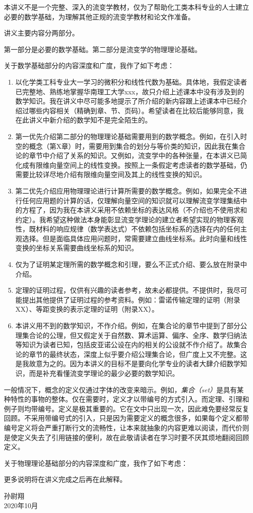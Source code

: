 \documentclass[main.tex]{subfiles}
\begin{document}
本讲义不是一个完整、深入的流变学教材，仅为了帮助化工类本科专业的人士建立必要的数学基础，为理解其他正规的流变学教材和论文作准备。

讲义主要内容分两部分。

第一部分是必要的数学基础。第二部分是流变学的物理理论基础。

关于数学基础部分的内容深度和广度，我作了如下考虑：
\begin{enumerate}
    \item 以化学类工科专业大一学习的微积分和线性代数为基础。具体地，我假定读者已完整地、熟练地掌握华南理工大学xxx，故只介绍上述课本中没有涉及到的数学知识。我在讲义中尽可能多地提示了所介绍的新内容跟上述课本中已经介绍过哪些内容相关（精确到章、节、页码）。希望读者在比较后能够同意，我在此讲义中新介绍的数学知不是完全陌生的。
    \item 第一优先介绍第二部分的物理理论基础需要用到的数学概念。例如，在引入时空的概念（第X章）时，需要用到集合的划分与等价类的知识，因此我在集合论的章节中介绍了关系的知识。又例如，流变学中的各种张量，在本讲义已简化成有限维向量空间上的线性变换。按照上一条假定考虑读者的数学基础，仍需要比较详尽地介绍有限维向量空间及其上的线性变换的知识。
    \item 第二优先介绍应用物理理论进行计算所需要的数学概念。例如，如果完全不进行任何应用题的计算的话，仅理解向量空间的知识就可以理解流变学理集结中的方程了，因为我在本讲义采用不依赖坐标的表达风格（不介绍也不使用求和约定）。我希望这种做法本身能彰显流变学理论的建立者希望实现的物理客观性，既材料的响应规律（数学表达式）不依赖包括坐标系的选择在内的任何主观选择。但是面临具体应用问题时，常需要建立曲线坐标系。此时向量和线性变换的坐标关系需要曲线坐标系的知识。
    \item 仅为了证明某定理所需的数学概念和引理，要么不正式介绍、要么放在附录中介绍。
    \item 定理的证明过程，仅供有兴趣的读者参考，故未必都提供。不提供时，我尽可能提出其他提供了证明过程的参考资料。例如：雷诺传输定理的证明（附录XX）、等距变换的表示定理的证明（附录XX）。
    \item 本讲义用不到的数学知识，不作介绍。例如，在集合论的章节中提到了部分公理集合论的公理，但又假定关于自然数、算术运算、偏序、全序、数学归纳法等知识为读者已知，包括皮亚诺公设在内的相关的公设就不作介绍了。故集合论的章节的最终状态，深度上似乎要介绍公理集合论，但广度上又不完整。这是我故意为之的。因为本讲义的目标不是要向化学专业的读者大肆介绍数学知识，而是补充看懂流变学理论的最少必要的数学知识。
\end{enumerate}

一般情况下，概念的定义仅通过字体的改变来暗示。例如，\emph{集合（set）}是具有某种特性的事物的整体。仅在需要时，定义才以带编号的方式引入。而定理、引理和例子则均带编号。定义是极其重要的。它在文中只出现一次，因此难免要经常反复回顾。不采用带编号式的引入，只是因为需要定义的概念很多，如果每个定义都带编号定义将会严重打断行文的流畅性，让本来就抽象的内容更难以阅读，而代价则是使定义失去了引用链接的便利，故在此敬请读者在学习时要不厌其烦地翻阅回顾定义。

关于物理理论基础部分的内容深度和广度，我作了如下考虑：


更多说明将在讲义完成之后再在此解释。
\begin{flushright}
孙尉翔\\
2020年10月
\end{flushright}
\end{document}

